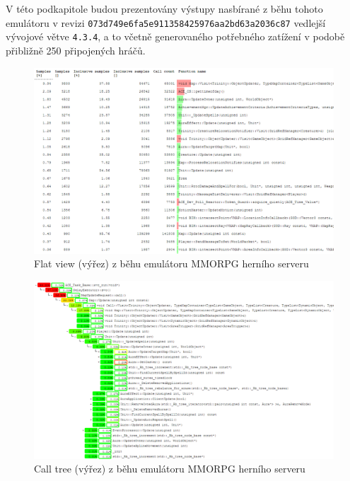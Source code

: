 \documentclass[czech,BP]{thesiskiv}
\begin{document}
V této podkapitole budou prezentovány výstupy nasbírané z běhu tohoto emulátoru v revizi \texttt{073d749e6fa5e911358425976aa2bd63a2036c87} vedlejší vývojové větve \texttt{4.3.4}, a to včetně generovaného potřebného zatížení v podobě přibližně 250 připojených hráčů.

\begin{figure}[h]
    \centering
    \includegraphics[interpolate,width=1.0\textwidth]{img/test-gcore-flat.png}
    \caption{Flat view (výřez) z běhu emulátoru MMORPG herního serveru}
    \label{obr:testprefflat-gcore}
\end{figure}

\begin{figure}[h]
    \centering
    \includegraphics[interpolate,width=1.0\textwidth]{img/test-gcore-calltree.png}
    \caption{Call tree (výřez) z běhu emulátoru MMORPG herního serveru}
    \label{obr:testpreftree-gcore}
\end{figure}
\end{document}
